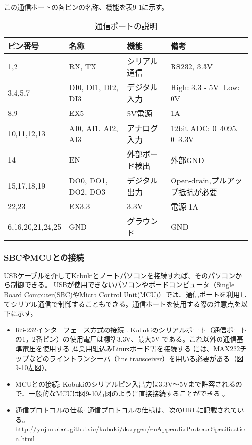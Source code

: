この通信ポートの各ピンの名称、機能を表9-1に示す。

\begin{table}[htp]
\centering
\small
\begin{tabular}{p{3cm} p{3cm} p{3cm} p{3cm}}
\toprule
\textbf{ピン番号} & \textbf{名称} & \textbf{機能} & \textbf{備考}\\
\midrule
1,2 & RX, TX  & シリアル通信  & RS232, 3.3V \\
3,4,5,7 & DI0, DI1, DI2, DI3  & デジタル入力  & High: 3.3 - 5V, Low: 0V \\
8,9 & EX5 & 5V電源  & 1A \\
10,11,12,13 & AI0, AI1, AI2, AI3  & アナログ入力  & 12bit ADC: 0~4095, 0~3.3V \\
14  & EN  & 外部ボード検出 & 外部GND \\
15,17,18,19 & DO0, DO1, DO2, DO3  & デジタル出力  & Open-drain,プルアップ抵抗が必要} \\
22,23 & EX3.3 & 3.3V & 電源 1A \\
6,16,20,21,24,25  & GND & グラウンド & GND \\
\bottomrule
\end{tabular}
\caption{通信ポートの説明}
\end{table}

\subsubsection{SBCやMCUとの接続}

USBケーブルを介してKobukiとノートパソコンを接続すれば、そのパソコンから制御できる。  USBが使用できないパソコンやボードコンピュータ（Single Board Computer(SBC)やMicro Control Unit(MCU)）では、通信ポートを利用してシリアル通信で制御することもできる。通信ポートを使用する際の注意点を以下に示す。

\begin{itemize}
\item RS-232インターフェース方式の接続  : Kobukiのシリアルポート（通信ポートの1，2番ピン）の使用電圧は標準3.3V、最大5V   である。これ以外の通信基準電圧を使用する 産業用組込みLinuxボード等を接続する   には、MAX232チップなどのライントランシーバ（line transceiver）を用いる必要がある（図9-10左図）。
\item MCUとの接続: Kobukiのシリアルピン入出力は3.3V〜5Vまで許容されるので、一般的なMCUは図9-10右図のように直接接続することができる  。
\item 通信プロトコルの仕様: 通信プロトコルの仕様は、次のURLに記載されている。
\\http://yujinrobot.github.io/kobuki/doxygen/enAppendixProtocolSpecification.html
\end{itemize}

